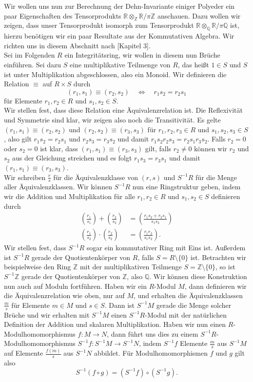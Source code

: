 \documentclass[11pt,titlepage]{article}
\newcommand{\setZ}{\mathbb{Z}}
\newcommand{\setQ}{\mathbb{Q}}
\newcommand{\setR}{\mathbb{R}}
\theoremstyle{definition}
\theoremstyle{remark}
\begin{document}
	Wir wollen uns nun zur Berechnung der Dehn-Invariante einiger Polyeder ein paar Eigenschaften des Tensorprodukts $\setR\otimes_{\setZ}\setR /\pi\setZ$ anschauen. Dazu wollen wir zeigen, dass unser Tensorprodukt isomorph zum Tensorprodukt  
	$\setR\otimes_{\setQ}\setR /\pi\setQ$ ist, hierzu benötigen wir ein 
	paar Resultate 
	aus der Kommutativen Algebra. Wir richten uns in diesem Abschnitt 
	nach \cite{introductiontocomalg}[Kapitel 3].\\
	Sei im Folgenden $R$ ein Integritätsring, wir wollen in diesem nun 
	Brüche einführen. Sei dazu $S$ eine multiplikative Teilmenge von $R$, das heißt  
	$1\in S$ und $S$ ist unter Multiplikation abgeschlossen, also ein Monoid. Wir 
	definieren die Relation $\equiv$ auf $R\times S$ durch
	\[(r_1,s_1)\equiv(r_2,s_2)\quad \Leftrightarrow\quad r_1 s_2 =r_2 s_1\]
	für Elemente $r_1,r_2\in R$ und $s_1,s_2\in S$. \\
	Wir stellen fest, dass diese Relation  eine Äquivalenzrelation ist. Die 
	Reflexivität und Symmetrie sind klar, wir zeigen also noch die Transitivität.
	Es gelte $(r_1,s_1)\equiv(r_2,s_2)$ und $(r_2,s_2)\equiv(r_3,s_3)$ für 
	$r_1,r_2,r_3\in R$ und $s_1,s_2,s_3\in S$, also gilt $r_1 s_2= r_2 s_1$ und 
	$r_2 s_3 =r_3 s_2$ und damit $r_1 s_2 r_2 s_3 =r_2 s_1 r_3 s_2$. Falls $r_2=0$ 
	oder $s_2=0$ 
	ist klar, dass $(r_1,s_1)\equiv(r_3,s_3)$ gilt, falls $r_2\neq 0$ können wir $r_2$ und $s_2$ aus der Gleichung streichen und es folgt 
	$r_1 s_3=r_3 s_1$ und damit $(r_1,s_1)\equiv(r_3,s_3)$. \\
	Wir schreiben $\frac{r}{s}$ für die Äquivalenzklasse 
	von $(r,s)$ und $S^{-1}R$ 
	für die Menge aller Äquivalenzklassen. 
	Wir können $S^{-1}R$ nun eine Ringstruktur geben, indem wir die Addition und Multiplikation für 
	alle $r_1,r_2\in R$ und $s_1,s_2\in S$ definieren durch
	\begin{align*}
		\left(\frac{r_1}{s_1}\right)+\left(\frac{r_2}{s_2}\right)
		&=\left(\frac{r_1s_2+r_2s_1}{s_1s_2}\right) \\
		\left(\frac{r_1}{s_2}\right)\cdot\left(\frac{r_2}{s_2}\right)
		&=\left(\frac{r_1r_2}{s_1s_2}\right).
	\end{align*}
	Wir stellen fest, dass 
	$S^{-1}R$ sogar ein kommutativer Ring mit Eins ist. Außerdem ist 
	$S^{-1}R$ gerade der Quotientenkörper von $R$, falls $S=R\setminus\{0\}$ ist. Betrachten wir beispielweise den Ring 
	$\setZ$ mit der multiplikativen Teilmenge $S=\setZ\setminus\{0\}$, so 
	ist $S^{-1}\setZ$ gerade der Quotientenkörper von $\setZ$, also 
	$\setQ$. Wir können diese Konstruktion nun auch auf Moduln fortführen. 
	Haben wir ein $R$-Modul $M$, dann definieren wir 
	die Äquivalenzrelation wie oben, nur auf $M$, und erhalten die 
	Äquivalenzklassen $\frac{m}{s}$ für Elemente $m\in M$ und $s\in S$. 
	Dann ist $S^{-1}M$ gerade die Menge solcher Brüche und wir erhalten 
	mit $S^{-1}M$ einen $S^{-1}R$-Modul mit der natürlichen Definition 
	der Addition und skalaren Multiplikation. Haben wir nun einen 
	$R$-Modulhomomorphismus $f:M\to N$, dann führt uns dies zu einem 
	$S^{-1}R$-Modulhomomorphismus $S^{-1}f:S^{-1}M\to S^{-1}N$, indem $S^{-1}f$ 
	Elemente $\frac{m}{s}$ aus $S^{-1}M$ auf Elemente $\frac{f(m)}{s}$ 
	aus $S^{-1}N$ abbildet. Für Modulhomomorphismen $f$ und $g$ gilt also 
	\[S^{-1}(f\circ g)=(S^{-1}f)\circ(S^{-1}g).\]
	
\end{document}
